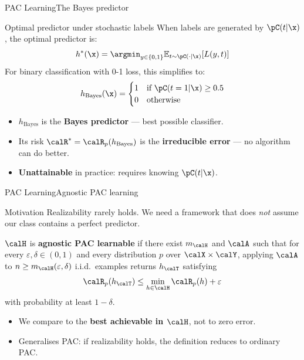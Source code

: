 \begin{frame}{PAC Learning}{The Bayes predictor}
  \begin{block}{Optimal predictor under stochastic labels}
    When labels are generated by $\pC(t|\x)$, the optimal predictor is:
    \[
      h^*(\x) = \argmin_{y \in \{0,1\}} \mathbb{E}_{t\sim\pC(\cdot|\x)}[L(y,t)]
    \]
    For binary classification with 0-1 loss, this simplifies to:
    \[
      h_{\text{Bayes}}(\x) =
      \begin{cases}
        1 & \text{if } \pC(t=1|\x) \geq 0.5 \\
        0 & \text{otherwise}
      \end{cases}
    \]
  \end{block}
  \begin{itemize}
    \item $h_{\text{Bayes}}$ is the \textcolor{AccentBlue}{\textbf{Bayes predictor}}
          — best possible classifier.
    \item Its risk $\calR^* = \calR_p(h_{\text{Bayes}})$ is the \textbf{irreducible error}
          — no algorithm can do better.
    \item \textbf{Unattainable} in practice: requires knowing $\pC(t|\x)$.
  \end{itemize}
\end{frame}

\begin{frame}{PAC Learning}{Agnostic PAC learning}
  \begin{block}{Motivation}
    Realizability rarely holds. We need a framework that does \emph{not} assume our class
    contains a perfect predictor.
  \end{block}
  \bigskip
  \begin{mydefinition}
    $\calH$ is \textcolor{AccentBlue}{\textbf{agnostic PAC learnable}} if there exist
    $m_\calH$ and $\calA$ such that for every $\varepsilon,\delta\in(0,1)$ and every
    distribution $p$ over $\calX\times\calY$, applying $\calA$ to
    $n\geq m_\calH(\varepsilon,\delta)$ i.i.d.\ examples returns $h_\calT$ satisfying
    \[
      \calR_p(h_\calT) \leq \min_{h\in\calH} \calR_p(h) + \varepsilon
    \]
    with probability at least $1-\delta$.
  \end{mydefinition}
  \begin{itemize}
    \item We compare to the \textbf{best achievable in $\calH$}, not to zero error.
    \item Generalises PAC: if realizability holds, the definition reduces to ordinary PAC.
  \end{itemize}
\end{frame}

